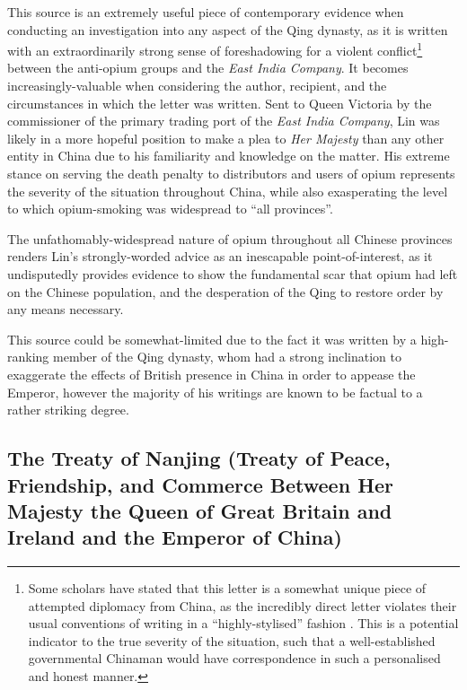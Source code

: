 \documentclass{article}
\begin{document}
This source is an extremely useful piece of contemporary evidence when conducting an investigation into any aspect of the Qing dynasty, as it is written with an extraordinarily strong sense of foreshadowing for a violent conflict\footnote{Some scholars have stated that this letter is a somewhat unique piece of attempted diplomacy from China, as the incredibly direct letter violates their usual conventions of writing in a ``highly-stylised'' fashion
\autocite{Kishlansky:1995}. This is a potential indicator to the true severity of the situation, such that a well-established governmental Chinaman would have correspondence in such a personalised and honest manner.} between the anti-opium groups and the \textit{East India Company}. It becomes increasingly-valuable when considering the author, recipient, and the circumstances in which the letter was written. Sent to Queen Victoria by the commissioner of the primary trading port of the \textit{East India Company}, Lin was likely in a more hopeful position to make a plea to \textit{Her Majesty} than any other entity in China due to his familiarity and knowledge on the matter. His extreme stance on serving the death penalty to distributors and users of opium represents the severity of the situation throughout China, while also exasperating the level to which opium-smoking was widespread to ``all provinces''.

The unfathomably-widespread nature of opium throughout all Chinese provinces renders Lin's strongly-worded advice as an inescapable point-of-interest, as it undisputedly provides evidence to show the fundamental scar that opium had left on the Chinese population, and the desperation of the Qing to restore order by any means necessary.

This source could be somewhat-limited due to the fact it was written by a high-ranking member of the Qing dynasty, whom had a strong inclination to exaggerate the effects of British presence in China in order to appease the Emperor, however the majority of his writings are known to be factual to a rather striking degree.

\subsection{The Treaty of Nanjing (Treaty of Peace, Friendship, and Commerce Between Her Majesty the Queen of Great Britain and Ireland and the Emperor of China)}
\end{document}
